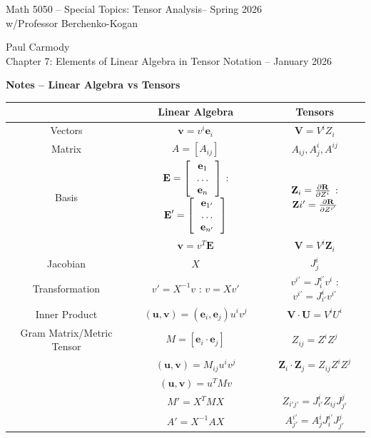 \documentclass[12pt,a4paper]{report}
\newcommand{\CLASSNAME}{Math 5050 -- Special Topics: Tensor Analysis}
\newcommand{\STUDENTNAME}{Paul Carmody}
\newcommand{\ASSIGNMENT}{Chapter 7: Elements of Linear Algebra in Tensor Notation }
\newcommand{\DUEDATE}{January 2026}
\newcommand{\PROFESSOR}{Professor Berchenko-Kogan}
\newcommand{\SEMESTER}{Spring 2026}
\newcommand{\VK}[1]{\textbf{#1}}
\begin{document}
\begin{center}
	\Large{\CLASSNAME -- \SEMESTER} \\
	\large{ w/\PROFESSOR}
\end{center}
\begin{center}
	\STUDENTNAME \\
	\ASSIGNMENT -- \DUEDATE\\
\end{center} 

\textbf{Notes  --  Linear Algebra vs Tensors}

\begin{tabular}{|c|c|c|}
	\hline
	& Linear Algebra & Tensors \\
	\hline
	Vectors & $\VK{v} = v^i\VK{e}_i$ & $\VK{V} = V^iZ_i$ \\
	\hline
	Matrix & $A=[ A_{ij} ]$ & $A_{ij}, A^i_j, A^{ij}$ \\
	\hline
	Basis & $\VK{E}=\COLVECTOR{\VK{e}_1\\\dots\\\VK{e}_n}$ : $\VK{E}'=\COLVECTOR{\VK{e}_{1'}\\\dots\\\VK{e}_{n'}}$ & $\VK{Z}_i = \PART{\VK{R}}{Z^i}$ : $\VK{Z}i' = \PART{\VK{R}}{Z^{i'}}$\\
	\hline
	& $\VK{v} = v^T\VK{E}$ & $\VK{V} = V^i\VK{Z}_i$ \\
	\hline
	Jacobian & $X$ & $J^i_j$ \\
	\hline
	Transformation & $ v' = X^{-1}v$ : $v=Xv'$ & $v^{i'} = J^{i'}_iv^i$ : $v^{i'} = J^{i}_{i'}v^{i'}$ \\
	\hline
	Inner Product & $(\VK{u},\VK{v}) = (\VK{e}_i,\VK{e}_j)u^iv^j$ & $\VK{V}\cdot\VK{U} = V^iU^i$ \\
	\hline
	Gram Matrix/Metric Tensor & $M = [ \VK{e}_i\cdot \VK{e}_j ]$ & $Z_{ij} = Z^iZ^j$ \\
	\hline
	& $(\VK{u},\VK{v}) = M_{ij}u^iv^j$ & $\VK{Z}_i\cdot\VK{Z}_j = Z_{ij}Z^iZ^j$\\
	\hline 
	& $(\VK{u},\VK{v}) = u^TMv$ & \\
	\hline
	& $M' = X^TMX$ & $Z_{i'j'} = J^i_{i'}Z_{ij}J^j_{j'}$\\
	\hline
	& $A' = X^{-1}AX$ & $A^{i'}_{j'} = A^{i}_{j} J^{i'}_iJ^j_{j'}$\\
	\hline
\end{tabular}\\
\end{document}
